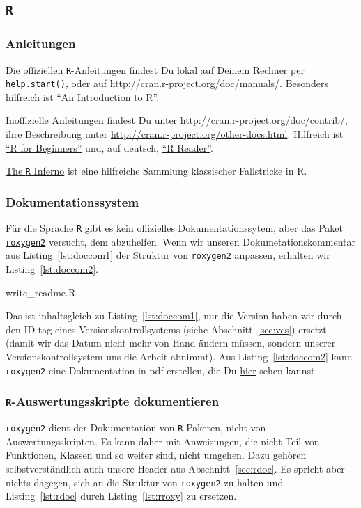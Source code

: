 \documentclass[twoside]{scrartcl}
\providecommand{\R}{\texttt{R}}
\providecommand{\code}[1]{\texttt{#1}}
\begin{document}
\subsection{\R{}}
\subsubsection{Anleitungen }
Die offiziellen  \R{}-Anleitungen findest Du lokal auf Deinem Rechner per 
\code{help.start()}, oder auf \url{http://cran.r-project.org/doc/manuals/}.
Besonders hilfreich ist 
\href{http://cran.r-project.org/doc/manuals/r-release/R-intro.pdf}
{"`An Introduction to R"'}.

Inoffizielle Anleitungen findest Du unter 
\url{http://cran.r-project.org/doc/contrib/}, ihre Beschreibung unter 
\url{http://cran.r-project.org/other-docs.html}. Hilfreich ist 
\href{http://cran.r-project.org/doc/contrib/Paradis-rdebuts_en.pdf}
{"`R for Beginners"'} 
und, auf deutsch, 
\href{http://cran.r-project.org/doc/contrib/Grosz+Peters-R-Reader.pdf}
{"`R Reader"'}.

\href{http://www.burns-stat.com/pages/Tutor/R_inferno.pdf}{The \R{} Inferno} ist
eine hilfreiche Sammlung klassischer Fallstricke in R. 

\subsubsection{Dokumentationssystem}
F\"u{}r die Sprache \R{}
gibt es kein offizielles Dokumentationssytem, aber 
das Paket \href{http://cran.r-project.org/web/packages/roxygen2/index.html}
{\code{roxygen2}} versucht, dem abzuhelfen. 
Wenn wir unseren Dokumetationskommentar aus Listing~\ref{lst:doccom1} der 
Struktur von \code{roxygen2} anpassen, erhalten wir Listing~\ref{lst:doccom2}.

%
{write_readme.R}

Das ist inhaltsgleich zu  Listing~\ref{lst:doccom1}, nur die Version haben wir 
durch den ID-tag eines Versionskontrollsystems (siehe Abschnitt~\ref{sec:vcs}) 
ersetzt (damit wir das Datum nicht mehr von Hand
\"a{}ndern m\"u{}ssen, sondern unserer Versionskontrollsystem uns die Arbeit
abnimmt).
Aus Listing~\ref{lst:doccom2}  kann \code{roxygen2} eine Dokumentation in pdf 
erstellen, die Du \href{write_readme.pdf}{hier} sehen kannst.

\subsubsection{\R{}-Auswertungsskripte dokumentieren
\label{sec:roxygen2ForSingleFiles}}
\code{roxygen2} dient der Dokumentation von \R{}-Paketen, nicht von
Auswertungsskripten. Es kann daher mit Anweisungen, die nicht Teil von
Funktionen, Klassen und so weiter sind, nicht umgehen. Dazu geh\"oren
selbstverst\"a{}ndlich auch unsere Header aus Abschnitt~\ref{sec:rdoc}.
Es spricht aber nichts dagegen, sich an die Struktur von \code{roxygen2} zu
halten und Listing~\ref{lst:rdoc} durch Listing~\ref{lst:rroxy} zu ersetzen.

\end{document}
